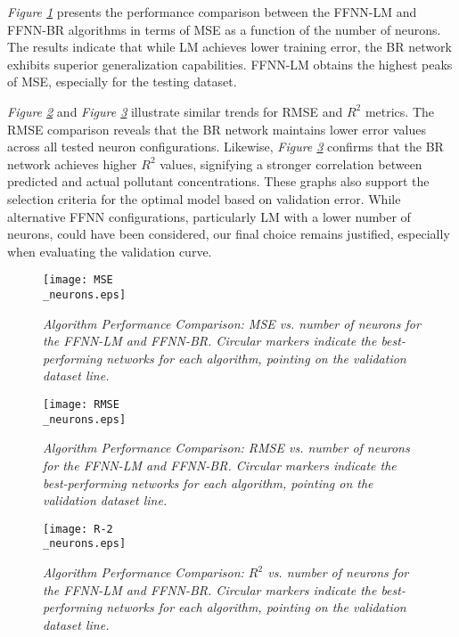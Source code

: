 \documentclass[10pt]{article}
\begin{document}
	\textit{Figure \ref{fig:comparisonMSE}} presents the performance comparison between the FFNN-LM and FFNN-BR algorithms in terms of MSE as a function of the number of neurons. The results indicate that while LM achieves lower training error, the BR network exhibits superior generalization capabilities. FFNN-LM obtains the highest peaks of MSE, especially for the testing dataset.
	
	\textit{Figure \ref{fig:comparisonRMSE}} and \textit{Figure \ref{fig:comparisonR2}} illustrate similar trends for RMSE and $R^2$ metrics. The RMSE comparison reveals that the BR network maintains lower error values across all tested neuron configurations. Likewise, \textit{Figure \ref{fig:comparisonR2}} confirms that the BR network achieves higher $R^2$ values, signifying a stronger correlation between predicted and actual pollutant concentrations. These graphs also support the selection criteria for the optimal model based on validation error. While alternative FFNN configurations, particularly LM with a lower number of neurons, could have been considered, our final choice remains justified, especially when evaluating the validation curve.
	
	\begin{figure}[H]
		\centering
		\texttt{[image: MSE\\\_neurons.eps]}
		\caption{\textit{Algorithm Performance Comparison: MSE vs. number of neurons for the FFNN-LM and FFNN-BR. Circular markers indicate the best-performing networks for each algorithm, pointing on the validation dataset line.}}
		\label{fig:comparisonMSE}
	\end{figure}
	
	\begin{figure}[H]
		\centering
		\texttt{[image: RMSE\\\_neurons.eps]}
		\caption{\textit{Algorithm Performance Comparison: RMSE vs. number of neurons for the FFNN-LM and FFNN-BR. Circular markers indicate the best-performing networks for each algorithm, pointing on the validation dataset line.}}
		\label{fig:comparisonRMSE}
	\end{figure}
	
	\begin{figure}[H]
		\centering
		\texttt{[image: R-2\\\_neurons.eps]}
		\caption{\textit{Algorithm Performance Comparison: \(R^2\) vs. number of neurons for the FFNN-LM and FFNN-BR. Circular markers indicate the best-performing networks for each algorithm, pointing on the validation dataset line.}}
		\label{fig:comparisonR2}
	\end{figure}
	
\end{document}
